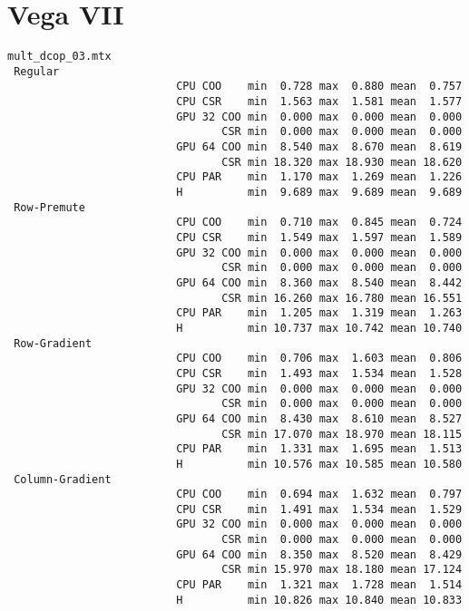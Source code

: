 \section{Vega VII}
\label{sec:vega}
\small
\begin{verbatim}
mult_dcop_03.mtx
 Regular
                          CPU COO    min  0.728 max  0.880 mean  0.757
                          CPU CSR    min  1.563 max  1.581 mean  1.577
                          GPU 32 COO min  0.000 max  0.000 mean  0.000
                                 CSR min  0.000 max  0.000 mean  0.000
                          GPU 64 COO min  8.540 max  8.670 mean  8.619
                                 CSR min 18.320 max 18.930 mean 18.620
                          CPU PAR    min  1.170 max  1.269 mean  1.226
                          H          min  9.689 max  9.689 mean  9.689
 Row-Premute
                          CPU COO    min  0.710 max  0.845 mean  0.724
                          CPU CSR    min  1.549 max  1.597 mean  1.589
                          GPU 32 COO min  0.000 max  0.000 mean  0.000
                                 CSR min  0.000 max  0.000 mean  0.000
                          GPU 64 COO min  8.360 max  8.540 mean  8.442
                                 CSR min 16.260 max 16.780 mean 16.551
                          CPU PAR    min  1.205 max  1.319 mean  1.263
                          H          min 10.737 max 10.742 mean 10.740
 Row-Gradient
                          CPU COO    min  0.706 max  1.603 mean  0.806
                          CPU CSR    min  1.493 max  1.534 mean  1.528
                          GPU 32 COO min  0.000 max  0.000 mean  0.000
                                 CSR min  0.000 max  0.000 mean  0.000
                          GPU 64 COO min  8.430 max  8.610 mean  8.527
                                 CSR min 17.070 max 18.970 mean 18.115
                          CPU PAR    min  1.331 max  1.695 mean  1.513
                          H          min 10.576 max 10.585 mean 10.580
 Column-Gradient
                          CPU COO    min  0.694 max  1.632 mean  0.797
                          CPU CSR    min  1.491 max  1.534 mean  1.529
                          GPU 32 COO min  0.000 max  0.000 mean  0.000
                                 CSR min  0.000 max  0.000 mean  0.000
                          GPU 64 COO min  8.350 max  8.520 mean  8.429
                                 CSR min 15.970 max 18.180 mean 17.124
                          CPU PAR    min  1.321 max  1.728 mean  1.514
                          H          min 10.826 max 10.840 mean 10.833

\end{verbatim}

